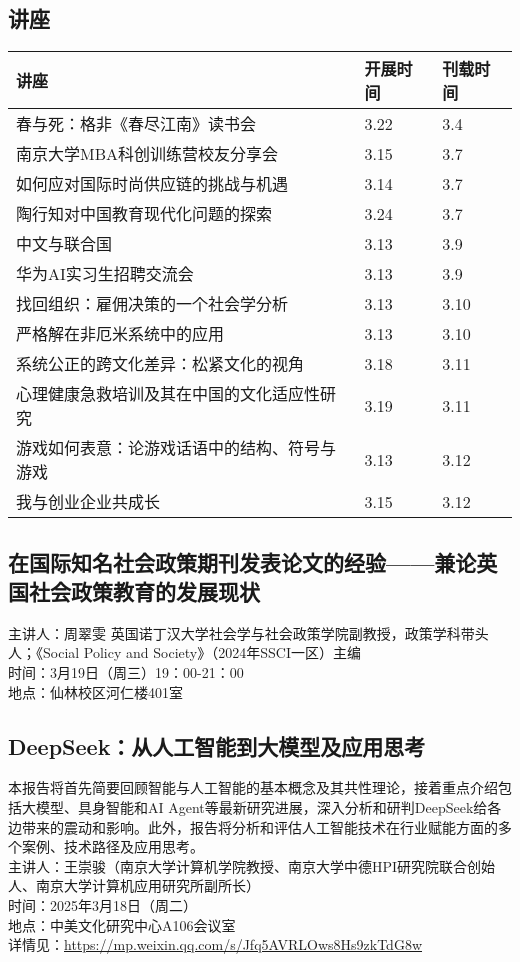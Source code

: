 \documentclass[letterpaper, 12pt]{article}
\begin{document}
\begin{multicols}{2}
\pagebreak
\section{讲座}
\begin{tabular}{|>{\centering\arraybackslash}m{}|m{}|m{}|}
    \hline
    讲座 & 开展时间 & 刊载时间\\
    \hline\hline
    春与死：格非《春尽江南》读书会 & 3.22 & 3.4\\\hline
    南京大学MBA科创训练营校友分享会 & 3.15 & 3.7\\\hline
    如何应对国际时尚供应链的挑战与机遇 & 3.14 & 3.7\\\hline
    陶行知对中国教育现代化问题的探索 & 3.24 & 3.7\\\hline
    中文与联合国 & 3.13 & 3.9\\\hline
    华为AI实习生招聘交流会 & 3.13 & 3.9\\\hline
    找回组织：雇佣决策的一个社会学分析 & 3.13 & 3.10\\\hline
    严格解在非厄米系统中的应用 & 3.13 & 3.10\\\hline
    系统公正的跨文化差异：松紧文化的视角 & 3.18 & 3.11\\\hline
    心理健康急救培训及其在中国的文化适应性研究 & 3.19 & 3.11\\\hline
    游戏如何表意：论游戏话语中的结构、符号与游戏 & 3.13 & 3.12\\\hline
    我与创业企业共成长 & 3.15 & 3.12\\\hline
\end{tabular}
\subsection{在国际知名社会政策期刊发表论文的经验——兼论英国社会政策教育的发展现状}
主讲人：周翠雯 英国诺丁汉大学社会学与社会政策学院副教授，政策学科带头人；《Social Policy and Society》（2024年SSCI一区）主编\\
时间：3月19日（周三）19：00-21：00\\
地点：仙林校区河仁楼401室\\

\subsection{DeepSeek：从人工智能到大模型及应用思考}
本报告将首先简要回顾智能与人工智能的基本概念及其共性理论，接着重点介绍包括大模型、具身智能和AI Agent等最新研究进展，深入分析和研判DeepSeek给各边带来的震动和影响。此外，报告将分析和评估人工智能技术在行业赋能方面的多个案例、技术路径及应用思考。\\
主讲人：王崇骏（南京大学计算机学院教授、南京大学中德HPI研究院联合创始人、南京大学计算机应用研究所副所长）\\
时间：2025年3月18日（周二）\\
地点：中美文化研究中心A106会议室\\
详情见：\url{https://mp.weixin.qq.com/s/Jfq5AVRLOws8Hs9zkTdG8w}\\


\end{multicols}
\end{document}
